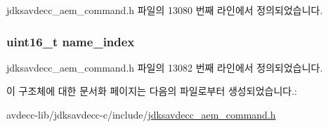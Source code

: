 jdksavdecc\+\_\+aem\+\_\+command.\+h 파일의 13080 번째 라인에서 정의되었습니다.

\subsubsection[{\texorpdfstring{name\+\_\+index}{name_index}}]{\setlength{\rightskip}{0pt plus 5cm}uint16\+\_\+t name\+\_\+index}\hypertarget{structjdksavdecc__aem__command__get__name_a898a74ada625e0b227dadb02901404e6}{}\label{structjdksavdecc__aem__command__get__name_a898a74ada625e0b227dadb02901404e6}


jdksavdecc\+\_\+aem\+\_\+command.\+h 파일의 13082 번째 라인에서 정의되었습니다.



이 구조체에 대한 문서화 페이지는 다음의 파일로부터 생성되었습니다.\+:\begin{DoxyCompactItemize}
\item 
avdecc-\/lib/jdksavdecc-\/c/include/\hyperlink{jdksavdecc__aem__command_8h}{jdksavdecc\+\_\+aem\+\_\+command.\+h}\end{DoxyCompactItemize}
